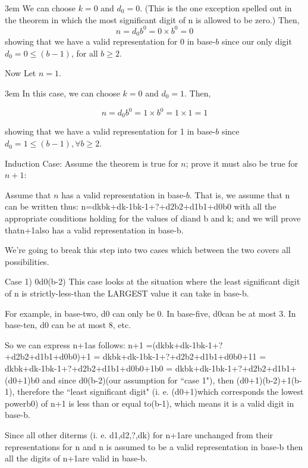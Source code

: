 \documentclass{article}
\newenvironment{jprIn1}{\begin{adjustwidth}{3em}{}}{\end{adjustwidth}}
\begin{document}
\begin{jprIn1}
We can choose $k=0$ and $d_0=0$.
(This is the one exception spelled out in the theorem in which the most significant digit of n is allowed to be zero.) Then,
\[n=d_0b^0=0\times{}b^0=0\]
showing that we have a valid representation for 0 in base-$b$ since our only digit\\
$d_0=0\le(b-1)$, for all $b\ge2$.
\end{jprIn1}

Now Let $n=1$.

\begin{jprIn1}
In this case,
we can choose $k=0$ and $d_0=1$.
Then,

\[n=d_0b^0=1\times{}b^0=1\times{}1=1\]

showing that we have a valid representation for 1 in base-$b$ since\\
$d_0=1\le(b-1), \forall{} b\ge2$.
\end{jprIn1}

Induction Case:
Assume the theorem is true for $n$;
prove it must also be true for $n+1$:
\bigskip

Assume that $n$ has a valid representation in base-$b$.
That is,
we assume that n can be written thus: 
n=dkbk+dk-1bk-1+?+d2b2+d1b1+d0b0
with all the appropriate conditions holding for the values of diand b and k; and we will prove thatn+1also has a valid representation in base-b.

We’re going to break this step into two cases which between the two covers all possibilities.

Case 1) 0d0(b-2)
This case looks at the situation where the least significant digit of n is strictly-less-than the LARGEST value it can take in base-b.

For example,
in base-two,
d0 can only be 0.
In base-five,
d0can be at most 3.
In base-ten,
d0 can be at most 8,
etc.

So we can express n+1as follows: 
n+1 =(dkbk+dk-1bk-1+?+d2b2+d1b1+d0b0)+1
= dkbk+dk-1bk-1+?+d2b2+d1b1+d0b0+11
= dkbk+dk-1bk-1+?+d2b2+d1b1+d0b0+1b0
= dkbk+dk-1bk-1+?+d2b2+d1b1+(d0+1)b0
and since d0(b-2)(our assumption for ``case 1"),
then 
(d0+1)(b-2)+1(b-1),
therefore the ``least significant digit" (i.
e.
(d0+1)which corresponds the lowest powerb0) of n+1 is less than or equal to(b-1),
which means it is a valid digit in base-b.

Since all other diterms (i.
e.
d1,d2,?,dk) for n+1are unchanged from their representations for n and n is assumed to be a valid representation in base-b then all the digits of n+1are valid in base-b.
\end{document}
